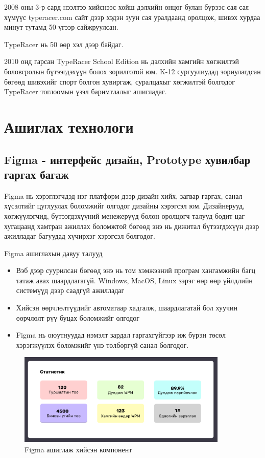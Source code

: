 2008 оны 3-р сард нээлтээ хийснээс хойш дэлхийн өнцөг булан бүрээс сая сая хүмүүс typeracer.com сайт дээр хэдэн зуун сая уралдаанд оролцож, шивэх хурдаа минут тутамд 50 үгээр сайжруулсан.

TypeRacer нь 50 өөр хэл дээр байдаг.

2010 онд гарсан TypeRacer School Edition нь дэлхийн хамгийн хөгжилтэй боловсролын бүтээгдэхүүн болох зорилготой юм. K-12 сургуулиудад зориулагдсан бөгөөд шивэхийг спорт болгон хувиргаж, суралцахыг хөгжилтэй болгодог TypeRacer тоглоомын үзэл баримтлалыг ашигладаг.
\section{Ашиглах технологи}

\subsection{Figma - интерфейс дизайн, Prototype хувилбар гаргах багаж}
Figma нь хэрэглэгчдэд нэг платформ дээр дизайн хийх, загвар гаргах, санал хүсэлтийг цуглуулах боломжийг олгодог дизайны хэрэгсэл юм. Дизайнерууд, хөгжүүлэгчид, бүтээгдэхүүний менежерүүд болон оролцогч талууд бодит цаг хугацаанд хамтран ажиллах боломжтой бөгөөд энэ нь дижитал бүтээгдэхүүн дээр ажилладаг багуудад хүчирхэг хэрэгсэл болгодог.

Figma ашиглахын давуу талууд
\begin{itemize}
	\item Вэб дээр суурилсан бөгөөд энэ нь том хэмжээний програм хангамжийн багц татаж авах шаардлагагүй. Windows, MacOS, Linux зэрэг өөр өөр үйлдлийн системүүд дээр саадгүй ажилладаг
	\item Хийсэн өөрчлөлтүүдийг автоматаар хадгалж, шаардлагатай бол хуучин өөрчлөлт рүү буцах боломжийг олгодог
	\item Figma нь оюутнуудад нэмэлт зардал гаргахгүйгээр иж бүрэн төсөл хэрэгжүүлэх боломжийг үнэ төлбөргүй санал болгодог.
\end{itemize}

\begin{figure}[h]
	\centering
	\includegraphics[width=10cm]{images/figma_component.png}
	\caption{Figma ашиглаж хийсэн компонент}
	\label{fig:figma}
\end{figure}

